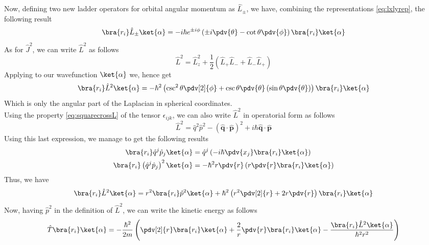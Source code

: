 \documentclass[a4paper, 11pt]{book}
\renewcommand{\vec}[1]{\mathbf{#1}}
\newcommand{\1}{\opr{\mathds{1}}}
\newcommand{\opr}[1]{\hat{#1}}
\newcommand{\lc}[1]{\epsilon_{#1}}
\newcommand{\ladopru}[1]{\opr{#1}_{+}}
\newcommand{\ladoprd}[1]{\opr{#1}_{-}}
\newcommand{\ladoprpm}[1]{\opr{#1}_{\pm}}
\theoremstyle{plain}
\begin{document}
	Now, defining two new ladder operators for orbital angular momentum as $\ladoprpm{L}$, we have, combining the representations \eqref{eq:lxlyrep}, the following result
	\begin{equation}
		\bra{r_i}\ladoprpm{L}\ket{\alpha}=-i\hbar e^{\pm i\phi}\left( \pm i\pdv{\theta}-\cot\theta\pdv{\phi} \right)\bra{r_i}\ket{\alpha}
		\label{eq:orbangmomladopr}
	\end{equation}
	As for $\opr{J}^2$, we can write $\opr{L}^2$ as follows
	\begin{equation}
		\opr{L}^2=\opr{L}^2_z+\frac{1}{2}\left( \ladopru{L}\ladoprd{L}+\ladoprd{L}\ladopru{L} \right)
		\label{eq:lsqlplm}
	\end{equation}
	Applying to our wavefunction $\ket{\alpha}$ we, hence get
	\begin{equation}
		\bra{r_i}\opr{L}^2\ket{\alpha}=-\hbar^2\left( \csc^2\theta\pdv[2]{\phi}+\csc\theta\pdv{\theta}\left( \sin\theta\pdv{\theta} \right) \right)\bra{r_i}\ket{\alpha}
		\label{eq:lsqwf}
	\end{equation}
	Which is only the angular part of the Laplacian in spherical coordinates.\\
	Using the property \eqref{eq:squarecrossL} of the tensor $\lc{ijk}$, we can also write $\opr{L}^2$ in operatorial form as follows
	\begin{equation}
		\opr{L}^2=\opr{q}^2\opr{p}^2-\left( \opr{\vec{q}}\cdot\opr{\vec{p}} \right)^2+i\hbar\opr{\vec{q}}\cdot\opr{\vec{p}}
		\label{eq:lsqopform}
	\end{equation}
	Using this last expression, we manage to get the following results
	\begin{equation*}
		\begin{aligned}
			\bra{r_i}\opr{q}^j\opr{p}_j\ket{\alpha}&=\opr{q}^j\left( -i\hbar\pdv{x_j}\bra{r_i}\ket{\alpha} \right)\\
			\bra{r_i}\left( \opr{q}^j\opr{p}_j \right)^2\ket{\alpha}&=-\hbar^2r\pdv{r}\left( r\pdv{r}\bra{r_i}\ket{\alpha} \right)
		\end{aligned}
	\end{equation*}
	Thus, we have
	\begin{equation}
		\bra{r_i}\opr{L}^2\ket{\alpha}=r^2\bra{r_i}\opr{p}^2\ket{\alpha}+\hbar^2\left( r^2\pdv[2]{r}+2r\pdv{r} \right)\bra{r_i}\ket{\alpha}
		\label{eq:lsqcomplete}
	\end{equation}
	Now, having $\opr{p}^2$ in the definition of $\opr{L}^2$, we can write the kinetic energy as follows
	\begin{equation}
		\opr{T}\bra{r_i}\ket{\alpha}=-\frac{\hbar^2}{2m}\left( \pdv[2]{r}\bra{r_i}\ket{\alpha}+\frac{2}{r}\pdv{r}\bra{r_i}\ket{\alpha}-\frac{\bra{r_i}\opr{L}^2\ket{\alpha}}{\hbar^2r^2} \right)
		\label{eq:kinenergyl2}
	\end{equation}
\end{document}

